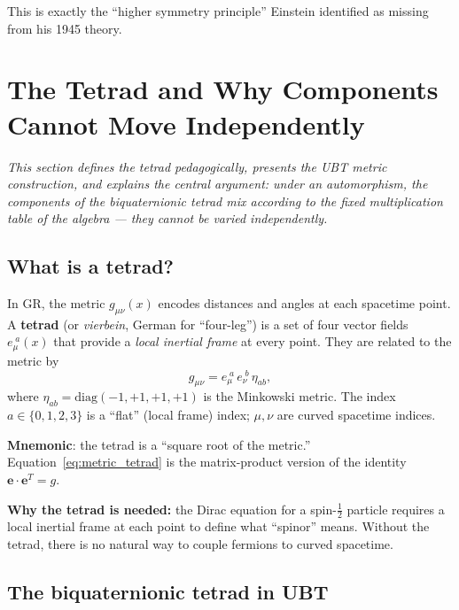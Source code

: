 \documentclass[12pt,a4paper]{article}
\theoremstyle{definition}
\theoremstyle{remark}
\begin{document}
This is exactly the ``higher symmetry principle'' Einstein identified as
missing from his 1945 theory.

\section{The Tetrad and Why Components Cannot Move Independently}
\label{sec:tetrad}

\textit{This section defines the tetrad pedagogically, presents the UBT metric
construction, and explains the central argument: under an automorphism, the
components of the biquaternionic tetrad mix according to the fixed
multiplication table of the algebra — they cannot be varied independently.}

\subsection{What is a tetrad?}

In GR, the metric $g_{\mu\nu}(x)$ encodes distances and angles at each
spacetime point.  A \textbf{tetrad} (or \emph{vierbein}, German for
``four-leg'') is a set of four vector fields $e_\mu^{\;a}(x)$ that provide a
\emph{local inertial frame} at every point.  They are related to the metric by
\begin{equation}
  \label{eq:metric_tetrad}
  g_{\mu\nu} = e_\mu^{\;a}\,e_\nu^{\;b}\,\eta_{ab},
\end{equation}
where $\eta_{ab} = \mathrm{diag}(-1,+1,+1,+1)$ is the Minkowski metric.
The index $a\in\{0,1,2,3\}$ is a ``flat'' (local frame) index;
$\mu,\nu$ are curved spacetime indices.

\medskip
\noindent\textbf{Mnemonic}: the tetrad is a ``square root of the metric.''
Equation~\eqref{eq:metric_tetrad} is the matrix-product version of the identity
$\mathbf{e}\cdot\mathbf{e}^T = g$.

\medskip
\noindent\textbf{Why the tetrad is needed:} the Dirac equation for a spin-$\frac{1}{2}$
particle requires a local inertial frame at each point to define what
``spinor'' means.  Without the tetrad, there is no natural way to couple
fermions to curved spacetime.

\subsection{The biquaternionic tetrad in UBT}
\end{document}
